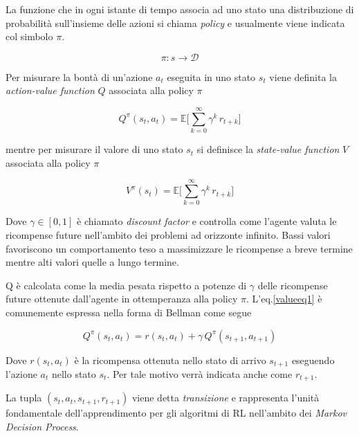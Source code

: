 La funzione che in ogni istante di tempo associa ad uno stato una distribuzione di probabilità sull'insieme delle azioni si chiama \textit{policy} e usualmente viene indicata col simbolo $\pi$.

\begin{equation}
	\pi: s \xrightarrow{} \mathcal{D}
\end{equation}

Per misurare la bontà di un'azione $a_t$ eseguita in uno stato $s_t$ viene definita la \textit{action-value function} $Q$ associata alla policy $\pi$

\begin{equation}\label{valueeq1}
	Q^\pi(s_t,a_t) = \mathbb{E}
	\Big[ 
	\sum\limits_{k = 0}^\infty\gamma^k \, r_{t+k}
	\Big]
\end{equation}

mentre per misurare il valore di uno stato $s_t$ si definisce la \textit{state-value function} $V$ associata alla policy $\pi$

\begin{equation}\label{valueev1}
	V^\pi(s_t) = \mathbb{E}
	\Big[ 
	\sum\limits_{k = 0}^\infty\gamma^k \, r_{t+k}
	\Big]
\end{equation}

Dove $\gamma \in [0,1]$ è chiamato \textit{discount factor} e controlla come l'agente valuta le ricompense future nell'ambito dei problemi ad orizzonte infinito\cite{rlSurvey}. Bassi valori favoriscono un comportamento teso a massimizzare le ricompense a breve termine mentre alti valori quelle a lungo termine.\newline

Q è calcolata come la media pesata rispetto a potenze di $\gamma$ delle ricompense future ottenute dall'agente in ottemperanza alla policy $\pi$. L'eq.\ref{valueeq1} è comunemente espressa nella forma di Bellman come segue

\begin{equation}
	Q^\pi(s_t,a_t) = r(s_t,a_t) + \gamma\, Q^\pi(s_{t+1},a_{t+1})
\end{equation}

Dove $r(s_t,a_t)$ è la ricompensa ottenuta nello stato di arrivo $s_{t+1}$ eseguendo l'azione $a_t$ nello stato $s_t$. Per tale motivo verrà indicata anche come $r_{t+1}$.\newline

La tupla $(s_t,a_t,s_{t+1},r_{t+1})$ viene detta \textit{transizione} e rappresenta l'unità fondamentale dell'apprendimento per gli algoritmi di RL nell'ambito dei \textit{Markov Decision Process}.

